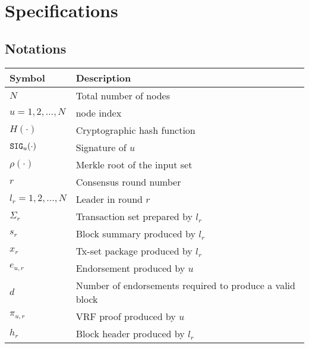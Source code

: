 \documentclass{article}
\begin{document}
\section{Specifications}
\subsection{Notations}
\renewcommand{\arraystretch}{2}
\begin{longtable}{p{3cm} p{10cm}}
    Symbol  & Description \\
    \hline\hline
    $N$ & Total number of nodes \\
    \hline
    $u=1,2,\dots,N$ & node index \\
    \hline
    $H(\cdot)$ & Cryptographic hash function \\
    \hline
    ${\tt SIG}_u(\cdot)$ & Signature of $u$ \\
    \hline
    $\rho\left(\cdot\right)$ & Merkle root of the input set\\
    \hline
    $r$ & Consensus round number \\
    \hline
    $l_r=1,2,...,N$ & Leader in round $r$ \\
    \hline
    $\Sigma_r$ & Transaction set prepared by $l_r$ \\
    \hline
    $s_r$ & Block summary produced by $l_r$ \\
    \hline
    $x_r$ & Tx-set package produced by $l_r$ \\
    \hline
    $e_{u,r}$ & Endorsement produced by $u$ \\
    \hline
    $d$ & Number of endorsements required to produce a valid block \\
    \hline
    $\pi_{u,r}$ & VRF proof produced by $u$ \\
    \hline
    $h_r$ & Block header produced by $l_r$ \\
    \hline

\end{longtable}
\end{document}
